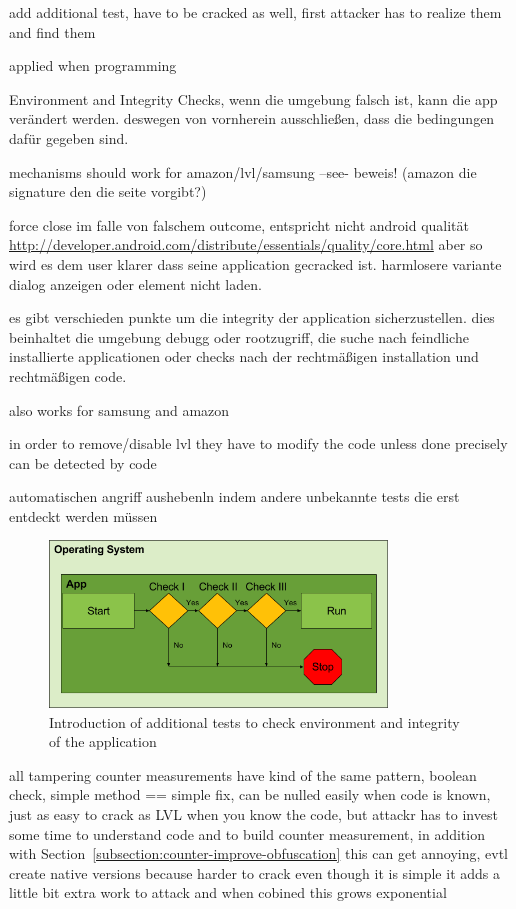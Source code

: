 add additional test, have to be cracked as well, first attacker has to realize them and find them

applied when programming

Environment and Integrity Checks, wenn die umgebung falsch ist, kann die app verändert werden. deswegen von vornherein ausschließen, dass die bedingungen dafür gegeben sind.
\cite{munteanLicense}

mechanisms should work for amazon/lvl/samsung --see- beweis! (amazon die signature den die seite vorgibt?)

force close im falle von falschem outcome, entspricht nicht android qualität
\url{http://developer.android.com/distribute/essentials/quality/core.html} aber so wird es dem user klarer dass seine application gecracked ist. harmlosere variante dialog anzeigen oder element nicht laden.

es gibt verschieden punkte um die integrity der application sicherzustellen. dies beinhaltet die umgebung debugg oder rootzugriff, die suche nach feindliche installierte applicationen oder checks nach der rechtmäßigen installation und rechtmäßigen code.

also works for samsung and amazon

%
in order to remove/disable lvl they have to modify the code
unless done precisely can be detected by code
\cite{developersSecuring}
%


automatischen angriff aushebenln indem andere unbekannte tests die erst entdeckt werden müssen

\begin{figure}[h]
    \centering
    \includegraphics[width=0.8\textwidth]{data/verificationNowAdditional.png}
    \caption{Introduction of additional tests to check environment and integrity of the application}
    \label{fig:verificationNowAdditional}
\end{figure}


all tampering counter measurements have kind of the same pattern, boolean check, simple method == simple fix, can be nulled easily when code is known, just as easy to crack as LVL when you know the code, but attackr has to invest some time to understand code and to build counter measurement, in addition with Section~\ref{subsection:counter-improve-obfuscation} this can get annoying, evtl create native versions because harder to crack
even though it is simple it adds a little bit extra work to attack and when cobined this grows exponential

